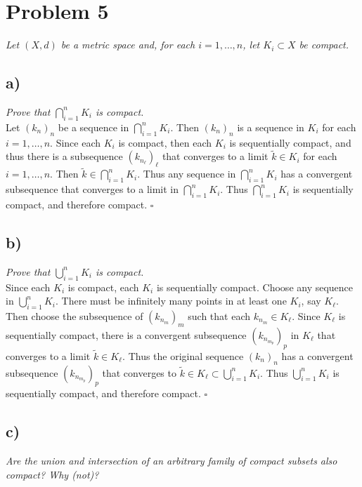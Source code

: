 \documentclass[12pt]{article}
\begin{document}
\section*{Problem 5}
{\it Let $(X,d)$ be a metric space and, for each $i = 1, \dots, n$, let $K_i \subset X$ be compact.}

\subsection*{ a)}
{\it Prove that $\bigcap_{i=1}^{n}K_i$ is compact.} \\

Let $(k_n)_n$ be a sequence in $\bigcap_{i=1}^n K_i$.  Then $(k_n)_n$ is a sequence in $K_i$ for each $i = 1, \dots, n$.  Since each $K_i$ is compact, then each $K_i$ is sequentially compact, and thus there is a subsequence $(k_{n_\ell})_\ell$ that converges to a limit $\tilde{k} \in K_i$ for each $i = 1, \dots, n$.  Then $\tilde{k} \in \bigcap_{i=1}^n K_i$.  Thus any sequence in $\bigcap_{i=1}^n K_i$ has a convergent subsequence that converges to a limit in $\bigcap_{i=1}^n K_i$.  Thus $\bigcap_{i=1}^n K_i$ is sequentially compact, and therefore compact. \hfill $\square$

\subsection*{ b)}
{\it Prove that $\bigcup_{i=1}^{n}K_i$ is compact.} \\

Since each $K_i$ is compact, each $K_i$ is sequentially compact.  Choose any sequence in $\bigcup_{i=1}^n K_i$.  There must be infinitely many points in at least one $K_i$, say $K_\ell$.  Then choose the subsequence of $(k_{n_m})_m$ such that each $k_{n_m} \in K_\ell$.  Since $K_\ell$ is sequentially compact, there is a convergent subsequence $(k_{n_{m_p}})_p$ in $K_\ell$ that converges to a limit $\tilde{k} \in K_\ell$.  Thus the original sequence $(k_n)_n$ has a convergent subsequence $(k_{n_{m_p}})_p$ that converges to $\tilde{k} \in K_\ell \subset \bigcup_{i=1}^{n}K_i$.  Thus $\bigcup_{i=1}^{n}K_i$ is sequentially compact, and therefore compact. \hfill $\square$

\subsection*{ c)}
{\it Are the union and intersection of an arbitrary family of compact subsets also compact?  Why (not)?} \\
\end{document}
